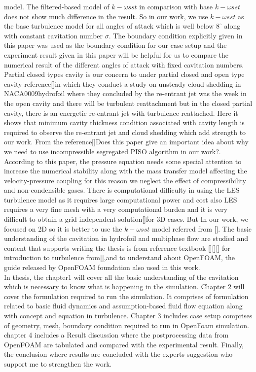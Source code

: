 model. The filtered-based model of $k-\omega sst$ in comparison with base $k-\omega sst$ does not show much difference in the result. So in our work, we use $k-\omega sst$ as the base turbulence model for all 
angles of attack which is well below $8^\circ$ along with constant cavitation number $\sigma$. The boundary condition explicitly given in this paper was used as the boundary condition for our case setup and
the experiment result given in this paper will be helpful for us to compare the numerical result of the different angles of attack with fixed cavitation numbers.
Partial closed types cavity is our concern to under partial closed and open type cavity reference[\cite{ceccio2001}]in which they conduct a study on unsteady cloud shedding in  NACA0009hydrofoil where
they concluded by the re-entrant jet was the week in the open cavity and there will be turbulent reattachment but in the closed partial cavity, there is an energetic re-entrant jet with turbulence reattached. Here it shows that
minimum cavity thickness condition associated with cavity length is required to observe the re-entrant jet and cloud shedding which add strength to our work.
From the reference[\cite{Bensow2010}]Does this paper give an important idea about why we need to use incompressible segregated PISO algorithm in our work?. According to this paper, the pressure equation
needs some special attention to increase the numerical stability along with the mass transfer model affecting the velocity-pressure coupling for this reason we neglect the effect of compressibility
and non-condensible gases. There is computational difficulty in using the LES turbulence model as it requires large computational power and cost also LES requires a very fine mesh with a very computational burden 
and it is very difficult to obtain a grid-independent solution[\cite{ZHANG2017}]for 3D cases. But In our work, we focused on 2D so it is better to use the $k-\omega sst$ model referred from [\cite{Zhao2021}].
The basic understanding of the cavitation in hydrofoil and multiphase flow are studied and content that supports writing the thesis is from reference textbook [\cite{Fundamentals of Cavitation.2004}][\cite{Cavitation Bubble Dynamics.1995}][\cite{brennen2005}]
for introduction to turbulence from[\cite{pope2000}],and to understand about OpenFOAM, the guide released by OpenFOAM foundation also used in this work.\\
In thesis, the chapter1 will cover all the basic understanding of the cavitation which is necessary to know what is happening in the simulation. Chapter 2 will cover the formulation required to run the 
simulation. It comprises of formulation related to basic fluid dynamics and assumption-based fluid flow equation along with concept and equation in turbulence. Chapter 3 includes case setup comprises 
of geometry, mesh, boundary condition required to run in OpenFoam simulation.  chapter 4 includes a Result discussion where the postprocessing data from OpenFOAM are tabulated and compared with the experimental result. Finally, the conclusion
where results are concluded with the experts suggestion who support me to strengthen the work.

